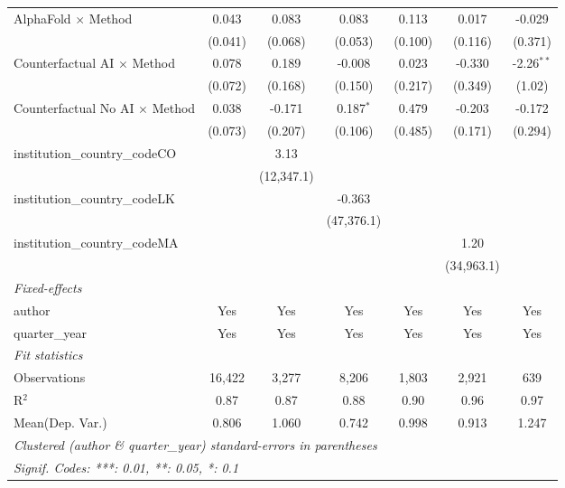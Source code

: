 \begin{tabular}{lcccccc}
   AlphaFold $\times$ Method             & 0.043         & 0.083         & 0.083         & 0.113       & 0.017         & -0.029\\   
                                         & (0.041)       & (0.068)       & (0.053)       & (0.100)     & (0.116)       & (0.371)\\   
   Counterfactual AI $\times$ Method     & 0.078         & 0.189         & -0.008        & 0.023       & -0.330        & -2.26$^{**}$\\   
                                         & (0.072)       & (0.168)       & (0.150)       & (0.217)     & (0.349)       & (1.02)\\   
   Counterfactual No AI $\times$ Method  & 0.038         & -0.171        & 0.187$^{*}$   & 0.479       & -0.203        & -0.172\\   
                                         & (0.073)       & (0.207)       & (0.106)       & (0.485)     & (0.171)       & (0.294)\\   
   institution\_country\_codeCO          &               & 3.13          &               &             &               &   \\   
                                         &               & (12,347.1)    &               &             &               &   \\   
   institution\_country\_codeLK          &               &               & -0.363        &             &               &   \\   
                                         &               &               & (47,376.1)    &             &               &   \\   
   institution\_country\_codeMA          &               &               &               &             & 1.20          &   \\   
                                         &               &               &               &             & (34,963.1)    &   \\   
   \midrule
   \emph{Fixed-effects}\\
   author                                & Yes           & Yes           & Yes           & Yes         & Yes           & Yes\\  
   quarter\_year                         & Yes           & Yes           & Yes           & Yes         & Yes           & Yes\\  
   \midrule
   \emph{Fit statistics}\\
   Observations                          & 16,422        & 3,277         & 8,206         & 1,803       & 2,921         & 639\\  
   R$^2$                                 & 0.87          & 0.87          & 0.88          & 0.90        & 0.96          & 0.97\\  
Mean(Dep. Var.) & 0.806 & 1.060 & 0.742 & 0.998 & 0.913 & 1.247 \\
   \midrule \midrule
   \multicolumn{7}{l}{\emph{Clustered (author \& quarter\_year) standard-errors in parentheses}}\\
   \multicolumn{7}{l}{\emph{Signif. Codes: ***: 0.01, **: 0.05, *: 0.1}}\\
\end{tabular}
\par\endgroup

